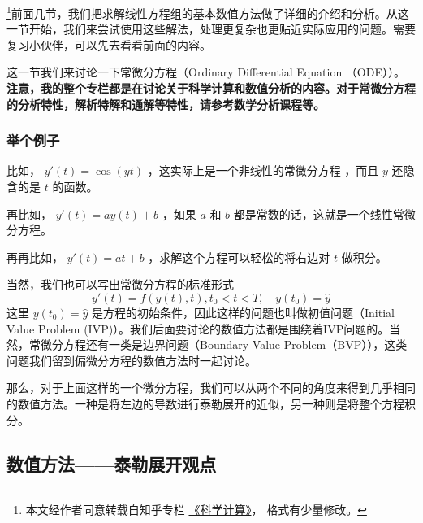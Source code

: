 
\footnote{本文经作者同意转载自知乎专栏 \href{https://www.zhihu.com/column/c_1226443594048942080}{《科学计算》}， 格式有少量修改。}前面几节，我们把求解线性方程组的基本数值方法做了详细的介绍和分析。从这一节开始，我们来尝试使用这些解法，处理更复杂也更贴近实际应用的问题。需要复习小伙伴，可以先去看看前面的内容。

这一节我们来讨论一下常微分方程（Ordinary Differential Equation （ODE））。\textbf{注意，我的整个专栏都是在讨论关于科学计算和数值分析的内容。对于常微分方程的分析特性，解析特解和通解等特性，请参考数学分析课程等。}

\subsubsection{举个例子}

比如， $y'(t)=\cos(yt)$ ，这实际上是一个非线性的常微分方程 ，而且 $y$ 还隐含的是 $t$ 的函数。

再比如， $y'(t)=ay(t)+b$ ，如果 $a$ 和 $b$ 都是常数的话，这就是一个线性常微分方程。

再再比如， $y'(t)=at+b$ ，求解这个方程可以轻松的将右边对 $t$ 做积分。

当然，我们也可以写出常微分方程的标准形式
\begin{equation}
y'(t)=f(y(t),t),t _0 < t < T,\quad y(t_0)=\hat{y}
\end{equation}
这里 $y(t_0)=\hat{y}$ 是方程的初始条件，因此这样的问题也叫做初值问题（Initial Value Problem (IVP)）。我们后面要讨论的数值方法都是围绕着IVP问题的。当然，常微分方程还有一类是边界问题（Boundary Value Problem（BVP）），这类问题我们留到偏微分方程的数值方法时一起讨论。

那么，对于上面这样的一个微分方程，我们可以从两个不同的角度来得到几乎相同的数值方法。一种是将左边的导数进行泰勒展开的近似，另一种则是将整个方程积分。

\subsection{数值方法——泰勒展开观点}

